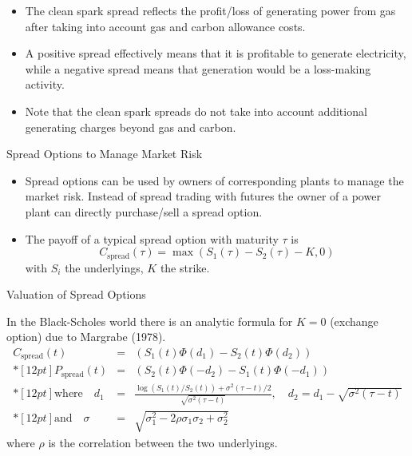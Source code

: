 \begin{itemize}
\item
The clean spark spread reflects the profit/loss of generating power from gas after taking into account gas and carbon allowance costs.
\item A positive spread effectively means that it is profitable to generate electricity, while a negative spread means that generation would be a loss-making activity.
\item Note that the clean spark spreads do not take into account additional generating charges beyond gas and carbon.
\end{itemize}






{Spread Options to Manage Market Risk}
\begin{itemize}
\item<1-> Spread options can be used by owners of corresponding plants to
manage the market risk. Instead of spread trading with futures the owner of a power plant can directly purchase/sell a spread option.
\item<2->
The payoff of a typical spread option with maturity $\tau$ is
$$C_{\mbox{spread}}{(\tau)}=\max(S_1(\tau)-S_2(\tau)-K,0)$$ with $S_i$ the
underlyings, $K$ the strike.
\end{itemize}



{Valuation of Spread Options}

In the Black-Scholes world  there is an analytic formula for $K=0$ (exchange option) due to
Margrabe (1978).
$$\begin{array}{lll}
 C_{\mbox{spread}}(t) & = & (S_1(t)\Phi(d_1)-S_2(t)\Phi(d_2))
 \\*[12pt]
 P_{\mbox{spread}}(t) & = & (S_2(t)\Phi(-d_2)-S_1(t)\Phi(-d_1))
 \\*[12pt]
 \mbox{where}\quad d_1 & = & \frac{\log(S_1(t)/S_2(t))+\sigma^{2}(\tau-t)/2}{\sqrt{\sigma^{2}(\tau-t)}},\quad d_2=d_1-\sqrt{\sigma^{2}(\tau-t)}
 \\*[12pt]
 \mbox{and}\quad \sigma & = & \sqrt{\sigma_1^2-2\rho\sigma_1\sigma_2+\sigma_2^2}
\end{array}$$
where $\rho$ is the correlation between the two underlyings.

